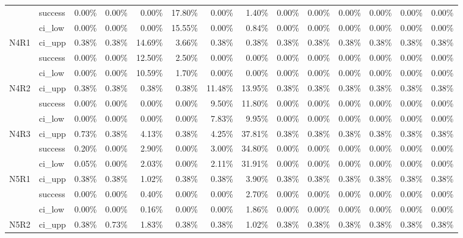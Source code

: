 \begin{tabular}{llrrrrrrrrrrrr}
     & success &       0.00\% & 0.00\% &  0.00\% & 17.80\% &  0.00\% &  1.40\% &        0.00\% & 0.00\% & 0.00\% & 0.00\% & 0.00\% & 0.00\% \\
     & ci\_low &       0.00\% & 0.00\% &  0.00\% & 15.55\% &  0.00\% &  0.84\% &        0.00\% & 0.00\% & 0.00\% & 0.00\% & 0.00\% & 0.00\% \\
N4R1 & ci\_upp &       0.38\% & 0.38\% & 14.69\% &  3.66\% &  0.38\% &  0.38\% &        0.38\% & 0.38\% & 0.38\% & 0.38\% & 0.38\% & 0.38\% \\
     & success &       0.00\% & 0.00\% & 12.50\% &  2.50\% &  0.00\% &  0.00\% &        0.00\% & 0.00\% & 0.00\% & 0.00\% & 0.00\% & 0.00\% \\
     & ci\_low &       0.00\% & 0.00\% & 10.59\% &  1.70\% &  0.00\% &  0.00\% &        0.00\% & 0.00\% & 0.00\% & 0.00\% & 0.00\% & 0.00\% \\
N4R2 & ci\_upp &       0.38\% & 0.38\% &  0.38\% &  0.38\% & 11.48\% & 13.95\% &        0.38\% & 0.38\% & 0.38\% & 0.38\% & 0.38\% & 0.38\% \\
     & success &       0.00\% & 0.00\% &  0.00\% &  0.00\% &  9.50\% & 11.80\% &        0.00\% & 0.00\% & 0.00\% & 0.00\% & 0.00\% & 0.00\% \\
     & ci\_low &       0.00\% & 0.00\% &  0.00\% &  0.00\% &  7.83\% &  9.95\% &        0.00\% & 0.00\% & 0.00\% & 0.00\% & 0.00\% & 0.00\% \\
N4R3 & ci\_upp &       0.73\% & 0.38\% &  4.13\% &  0.38\% &  4.25\% & 37.81\% &        0.38\% & 0.38\% & 0.38\% & 0.38\% & 0.38\% & 0.38\% \\
     & success &       0.20\% & 0.00\% &  2.90\% &  0.00\% &  3.00\% & 34.80\% &        0.00\% & 0.00\% & 0.00\% & 0.00\% & 0.00\% & 0.00\% \\
     & ci\_low &       0.05\% & 0.00\% &  2.03\% &  0.00\% &  2.11\% & 31.91\% &        0.00\% & 0.00\% & 0.00\% & 0.00\% & 0.00\% & 0.00\% \\
N5R1 & ci\_upp &       0.38\% & 0.38\% &  1.02\% &  0.38\% &  0.38\% &  3.90\% &        0.38\% & 0.38\% & 0.38\% & 0.38\% & 0.38\% & 0.38\% \\
     & success &       0.00\% & 0.00\% &  0.40\% &  0.00\% &  0.00\% &  2.70\% &        0.00\% & 0.00\% & 0.00\% & 0.00\% & 0.00\% & 0.00\% \\
     & ci\_low &       0.00\% & 0.00\% &  0.16\% &  0.00\% &  0.00\% &  1.86\% &        0.00\% & 0.00\% & 0.00\% & 0.00\% & 0.00\% & 0.00\% \\
N5R2 & ci\_upp &       0.38\% & 0.73\% &  1.83\% &  0.38\% &  0.38\% &  1.02\% &        0.38\% & 0.38\% & 0.38\% & 0.38\% & 0.38\% & 0.38\% \\

\end{tabular}
